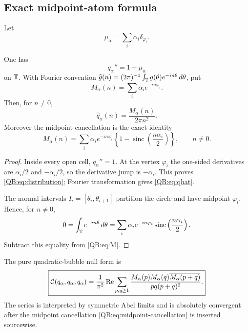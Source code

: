 \subsection{Exact midpoint-atom formula}

Let
\begin{equation}\label{QB:eq:mu}
 \mu_\alpha=\sum_i\alpha_i\delta_{\varphi_i}.
\end{equation}

\begin{lemma}
\label{QB:lem:distribution}
One has
\begin{equation}\label{QB:eq:distribution}
 q_\alpha''=1-\mu_\alpha
\end{equation}
on $\mathbb T$.  With Fourier convention
$\widehat g(n)=(2\pi)^{-1}\int_\mathbb T g(\theta)e^{-in\theta}\,d\theta$, put
\begin{equation}\label{QB:eq:M}
 M_\alpha(n)=\sum_i\alpha_i e^{-in\varphi_i}.
\end{equation}
Then, for $n\ne0$,
\begin{equation}\label{QB:eq:qhat}
 \widehat q_\alpha(n)=\frac{M_\alpha(n)}{2\pi n^2}.
\end{equation}
Moreover the midpoint cancellation is the exact identity
\begin{equation}\label{QB:eq:midpoint-cancellation}
 M_\alpha(n)=\sum_i\alpha_i e^{-in\varphi_i}
 \left\{1-\operatorname{sinc}\left(\frac{n\alpha_i}{2}\right)\right\},
 \qquad n\ne0.
\end{equation}
\end{lemma}

\begin{proof}
Inside every open cell, $q_\alpha''=1$.  At the vertex $\varphi_i$ the
one-sided derivatives are $\alpha_i/2$ and $-\alpha_i/2$, so the derivative
jump is $-\alpha_i$.  This proves \eqref{QB:eq:distribution}; Fourier
transformation gives \eqref{QB:eq:qhat}.

The normal intervals
$I_i=[\theta_i,\theta_{i+1}]$ partition the circle and have midpoint
$\varphi_i$.  Hence, for $n\ne0$,
\begin{equation*}
 0=\int_\mathbb T e^{-in\theta}\,d\theta
 =\sum_i\alpha_i e^{-in\varphi_i}
 \operatorname{sinc}\left(\frac{n\alpha_i}{2}\right).
\end{equation*}
Subtract this equality from \eqref{QB:eq:M}.
\end{proof}

\begin{theorem}
\label{QB:thm:discrete}
The pure quadratic-bubble null form is
\begin{equation}\label{QB:eq:discrete}
 \boxed{
 \mathcal C(q_\alpha,q_\alpha,q_\alpha)
 =\frac1{\pi^2}\operatorname{Re}
 \sum_{p,q\ge1}
 \frac{M_\alpha(p)M_\alpha(q)
 \overline{M_\alpha(p+q)}}{pq(p+q)^2}.}
\end{equation}
The series is interpreted by symmetric Abel limits and is absolutely
convergent after the midpoint cancellation \eqref{QB:eq:midpoint-cancellation}
is inserted sourcewise.
\end{theorem}

